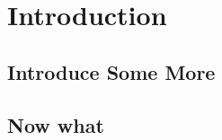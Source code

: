 \documentclass[a4paper, 12pt, oneside, onecolumn, openright]{mememoir}
\begin{document}


\frontmatter
\pagestyle{plain}





\tableofcontents*

\mainmatter

\pagestyle{sjt}


\chapter{Introduction}
\lipsum[12-23]

\section{Introduce Some More}

\lipsum[12]

\section{Now what}

\lipsum[42]
\end{document}
